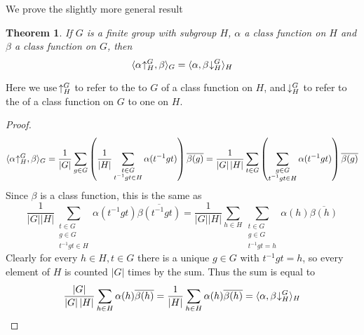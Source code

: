 \documentclass[12pt]{article}
\newcommand{\Abs}[1]{\left\lvert #1\right\rvert}
\newcommand{\ind}{\negmedspace\uparrow}
\newcommand{\res}{\negmedspace\downarrow}
\newtheorem{thm}{Theorem}[section]
\theoremstyle{definition}
\begin{document}
We prove the slightly more general result
\begin{thm} If $G$ is a finite group with subgroup $H$, $\alpha$ a class function on $H$ and $\beta$ a class function on $G$, then
\[
  \langle \alpha\ind_H^G,\beta \rangle_G = \langle \alpha,\beta\res_H^G\rangle_H
\]
\end{thm}
Here we use $\ind_H^G$ to refer to the  to $G$ of a class function on $H$, and $\res_H^G$ to refer to the  of a class function on $G$ to one on $H$.
\begin{proof}
\[
  \langle\alpha\ind_H^G,\beta\rangle_G 
  = \frac{1}{\Abs{G}}\sum_{g\in G}\left(\frac{1}{\Abs{H}}\sum_{\substack{t\in G\\t^{-1}gt\in H}}
      \alpha(t^{-1}gt)\right)\overline{\beta(g)} 
  = \frac{1}{\Abs{G}\Abs{H}}\sum_{t\in G}\left(\sum_{\substack{g\in G\\t^{-1}gt\in H}} 
      \alpha(t^{-1}gt)\right)\overline{\beta(g)}
\]
Since $\beta$ is a class function, this is the same as
\[
  \frac{1}{\Abs{G}\Abs{H}} \sum_{\substack{t\in G\\g\in G\\t^{-1}gt\in H}} 
    \alpha(t^{-1}gt)\overline{\beta(t^{-1}gt)}
  =\frac{1}{\Abs{G}\Abs{H}}\sum_{h\in H}\sum_{\substack{t\in G\\g\in G\\t^{-1}gt=h}} 
    \alpha(h)\overline{\beta(h)}
\]
Clearly for every $h\in H, t\in G$ there is a unique $g\in G$ with $t^{-1}gt=h$, so every element of $H$ is counted $\Abs{G}$ times by the  sum. Thus the sum is equal to
\[
  \frac{\Abs{G}}{\Abs{G}\Abs{H}}\sum_{h\in H} \alpha(h)\overline{\beta(h)} 
  = \frac{1}{\Abs{H}}\sum_{h\in H} \alpha(h)\overline{\beta(h)} 
  = \langle \alpha,\beta\res_H^G\rangle_H
\]\qedhere

\end{proof}
\end{document}
